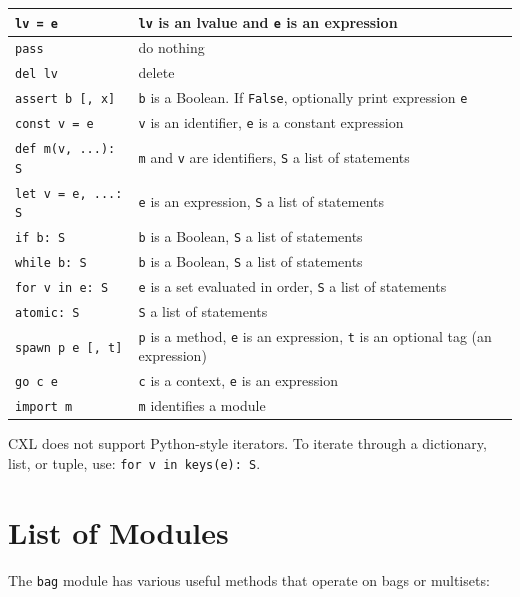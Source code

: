 \documentclass{report}
\begin{document}
\vspace{1em}
\begin{tabular}{|l|l|}
\hline
\texttt{lv = e} & \texttt{lv} is an lvalue and \texttt{e} is an expression\\
\hline
\texttt{pass} & do nothing\\
\hline
\texttt{del lv} & delete\\
\hline
\texttt{assert b [, x]} & \texttt{b} is a Boolean.  If \texttt{False}, optionally print expression \texttt{e}\\
\hline
\texttt{const v = e} & \texttt{v} is an identifier, \texttt{e} is a constant expression\\
\hline
\texttt{def m(v, ...): S} & \texttt{m} and \texttt{v} are identifiers, \texttt{S} a list of statements\\
\hline
\texttt{let v = e, ...: S} & \texttt{e} is an expression, \texttt{S} a list of statements\\
\hline
\texttt{if b: S} & \texttt{b} is a Boolean, \texttt{S} a list of statements\\
\hline
\texttt{while b: S} & \texttt{b} is a Boolean, \texttt{S} a list of statements\\
\hline
\texttt{for v in e: S} & \texttt{e} is a set evaluated in order,
                            \texttt{S} a list of statements\\
\hline
\texttt{atomic: S} & \texttt{S} a list of statements\\
\hline
\texttt{spawn p e [, t]} & \texttt{p} is a method, \texttt{e} is an expression, \texttt{t} is an optional tag (an expression) \\
\hline
\texttt{go c e} & \texttt{c} is a context, \texttt{e} is an expression \\
\hline
\texttt{import m} & \texttt{m} identifies a module \\
\hline
\end{tabular}
\vspace{1em}

CXL does not support Python-style iterators.
To iterate through a dictionary, list, or tuple, use:
\texttt{for v in keys(e):~S}.

\chapter{List of Modules}
\label{ap:module}

The \texttt{bag} module
has various useful methods that operate on bags or
multisets:
\end{document}
